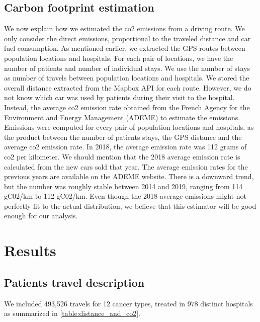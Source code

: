 \subsection{Carbon footprint estimation}

We now explain how we estimated the \ac{co2} emissions from a driving route. We
only consider the direct emissions, proportional to the traveled distance and
car fuel consumption. As mentioned earlier, we extracted the GPS routes between
population locations and hospitals. For each pair of locations, we have the
number of patients and number of individual stays. We use the number of stays as
number of travels between population locations and hospitals. We stored the
overall distance extracted from the Mapbox API for each route. However, we do
not know which car was used by patients during their visit to the hospital.
Instead, the average \ac{co2} emission rate obtained from the French Agency for
the Environment and Energy Management (ADEME) to estimate the emissions.
Emissions were computed for every pair of population locations and hospitals, as
the product between the number of patients stays, the GPS distance and the
average \ac{co2} emission rate. In 2018, the average emission rate was 112 grams
of \ac{co2} per kilometer. We should mention that the 2018 average emission rate
is calculated from the new cars sold that year. The average emission rates for
the previous years are available on the ADEME website. There is a downward
trend, but the number was roughly stable between 2014 and 2019, ranging from 114
gC02/km to 112 gC02/km. Even though the 2018 average emissions might not
perfectly fit to the actual distribution, we believe that this estimator will be
good enough for our analysis.

\section{Results}

\subsection{Patients travel description}

We included 493,526 travels for 12 cancer types, treated in 978 distinct
hospitals as summarized in \cref{table:distance_and_co2}.

